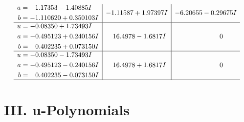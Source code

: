 \documentclass[1p]{elsarticle_modified}
\theoremstyle{definition}
\begin{document}
$$\begin{array}{c|c|c}
\begin{aligned}
a &= \phantom{-}1.17353 - 1.40885 I \\
b &= -1.110620 + 0.350103 I\end{aligned}
 & -1.11587 + 1.97397 I & -6.20655 - 0.29675 I \\ \hline\begin{aligned}
u &= -0.08350 + 1.73493 I \\
a &= -0.495123 + 0.240156 I \\
b &= \phantom{-}0.402235 + 0.073150 I\end{aligned}
 & \phantom{-}16.4978 - 1.6817 I & \phantom{-0.000000 } 0 \\ \hline\begin{aligned}
u &= -0.08350 - 1.73493 I \\
a &= -0.495123 - 0.240156 I \\
b &= \phantom{-}0.402235 - 0.073150 I\end{aligned}
 & \phantom{-}16.4978 + 1.6817 I & \phantom{-0.000000 } 0\\
 \hline 
 \end{array}$$\newpage
\newpage\renewcommand{\arraystretch}{1}
\centering \section*{ III. u-Polynomials}
\end{document}
